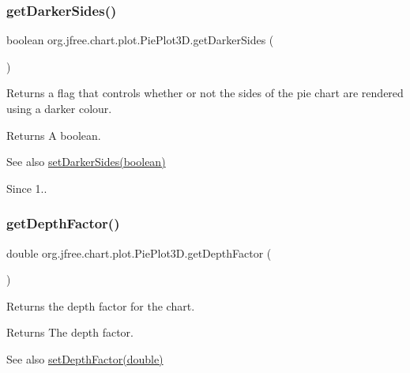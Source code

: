 \subsubsection{\texorpdfstring{get\+Darker\+Sides()}{getDarkerSides()}}
{\footnotesize\ttfamily boolean org.\+jfree.\+chart.\+plot.\+Pie\+Plot3\+D.\+get\+Darker\+Sides (\begin{DoxyParamCaption}{ }\end{DoxyParamCaption})}

Returns a flag that controls whether or not the sides of the pie chart are rendered using a darker colour.

\begin{DoxyReturn}{Returns}
A boolean.
\end{DoxyReturn}
\begin{DoxySeeAlso}{See also}
\mbox{\hyperlink{classorg_1_1jfree_1_1chart_1_1plot_1_1_pie_plot3_d_ad880cf39b21e7aee0c5a6f0d97859e4a}{set\+Darker\+Sides(boolean)}}
\end{DoxySeeAlso}
\begin{DoxySince}{Since}
1.. 
\end{DoxySince}
\mbox{\label{classorg_1_1jfree_1_1chart_1_1plot_1_1_pie_plot3_d_a10ffdfa0adfbe06f4344390b3e9596c5}} 
\subsubsection{\texorpdfstring{get\+Depth\+Factor()}{getDepthFactor()}}
{\footnotesize\ttfamily double org.\+jfree.\+chart.\+plot.\+Pie\+Plot3\+D.\+get\+Depth\+Factor (\begin{DoxyParamCaption}{ }\end{DoxyParamCaption})}

Returns the depth factor for the chart.

\begin{DoxyReturn}{Returns}
The depth factor.
\end{DoxyReturn}
\begin{DoxySeeAlso}{See also}
\mbox{\hyperlink{classorg_1_1jfree_1_1chart_1_1plot_1_1_pie_plot3_d_a8b4759289ed982cd7d456b44b90f6b13}{set\+Depth\+Factor(double)}} 
\end{DoxySeeAlso}
\mbox{\label{classorg_1_1jfree_1_1chart_1_1plot_1_1_pie_plot3_d_a938e095a670a32c462f0b626704b32fe}} 
